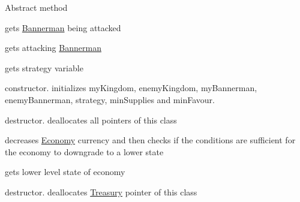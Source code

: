 \begin{DoxyRefList}
%
Abstract method  
\item[Member \mbox{\hyperlink{class_strategy_a88ed4a64031030f3a9a30652b01debe6}{Strategy\+::get\+Enemy\+Bannerman}} ()]\label{todo__todo000025}%
%
gets \mbox{\hyperlink{class_bannerman}{Bannerman}} being attacked  
\item[Member \mbox{\hyperlink{class_strategy_a0931adab8a2fe9b3cf68bbd626e10b3a}{Strategy\+::get\+My\+Bannerman}} ()]\label{todo__todo000024}%
%
gets attacking \mbox{\hyperlink{class_bannerman}{Bannerman}}  
\item[Member \mbox{\hyperlink{class_strategy_a310550043f6b81592cef05ea9241144f}{Strategy\+::get\+Strategy\+Name}} ()]\label{todo__todo000023}%
%
gets strategy variable  
\item[Member \mbox{\hyperlink{class_strategy_abf2f11a2d8b44147caf0ea37863c90e2}{Strategy\+::Strategy}} (\mbox{\hyperlink{class_kingdom}{Kingdom}} $\ast$my\+Kingdom, \mbox{\hyperlink{class_kingdom}{Kingdom}} $\ast$enemy\+Kingdom, \mbox{\hyperlink{class_bannerman}{Bannerman}} $\ast$my\+Bannerman, \mbox{\hyperlink{class_bannerman}{Bannerman}} $\ast$enemy\+Bannerman, string name, int min, int min\+Favour)]\label{todo__todo000021}%
%
constructor. initializes my\+Kingdom, enemy\+Kingdom, my\+Bannerman, enemy\+Bannerman, strategy, min\+Supplies and min\+Favour.  
\item[Member \mbox{\hyperlink{class_strategy_a37c0bbdd64fd7dfcdd91578784a64775}{Strategy\+::$\sim$\+Strategy}} ()]\label{todo__todo000026}%
%
destructor. deallocates all pointers of this class  
\item[Member \mbox{\hyperlink{class_unstable_state_a4e134532fc0e3f2471e06ad0996ae161}{Unstable\+State\+::decrease\+Currency}} ()]\label{todo__todo000027}%
%
decreases \mbox{\hyperlink{class_economy}{Economy}} currency and then checks if the conditions are sufficient for the economy to downgrade to a lower state  
\item[Member \mbox{\hyperlink{class_unstable_state_a655d00d68c7c2e08da6b4db0df14a600}{Unstable\+State\+::get\+Demotion\+State}} ()]\label{todo__todo000028}%
%
gets lower level state of economy  
\item[Member \mbox{\hyperlink{class_war_indicators_aa8ee75ff5bf3d7bc1fb7f82a6527e582}{War\+Indicators\+::$\sim$\+War\+Indicators}} ()]\label{todo__todo000029}%
%
destructor. deallocates \mbox{\hyperlink{class_treasury}{Treasury}} pointer of this class 
\end{DoxyRefList}